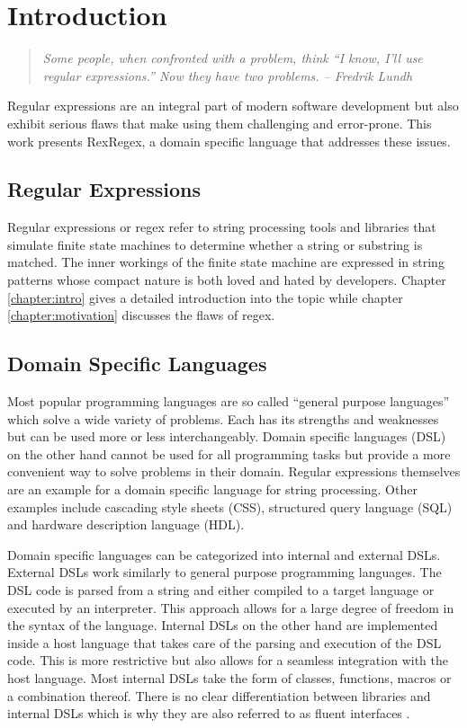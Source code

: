 \chapter{Introduction} \label{chapter:introtoall}

\begin{quote}
\emph{
Some people, when confronted with a problem, think
\enquote{I know, I'll use regular expressions.} Now they have two problems. -- Fredrik Lundh \cite{NowTwoProblems}
    }
\end{quote}

Regular expressions are an integral part of modern software development but also exhibit serious flaws that make using them challenging and error-prone. This work presents RexRegex, a domain specific language that addresses these issues.

\section{Regular Expressions}

Regular expressions or regex refer to string processing tools and libraries that simulate finite state machines to determine whether a string or substring is matched. The inner workings of the finite state machine are expressed in string patterns whose compact nature is both loved and hated by developers. Chapter \ref{chapter:intro} gives a detailed introduction into the topic while chapter \ref{chapter:motivation} discusses the flaws of regex.

\section{Domain Specific Languages}

Most popular programming languages are so called \enquote{general purpose languages} which solve a wide variety of problems. Each has its strengths and weaknesses but can be used more or less interchangeably. Domain specific languages (DSL) on the other hand cannot be used for all programming tasks but provide a more convenient way to solve problems in their domain. Regular expressions themselves are an example for a domain specific language for string processing. Other examples include cascading style sheets (CSS), structured query language (SQL) and hardware description language (HDL).

Domain specific languages can be categorized into internal and external DSLs. External DSLs work similarly to general purpose programming languages. The DSL code is parsed from a string and either compiled to a target language or executed by an interpreter. This approach allows for a large degree of freedom in the syntax of the language. Internal DSLs on the other hand are implemented inside a host language that takes care of the parsing and execution of the DSL code. This is more restrictive but also allows for a seamless integration with the host language. Most internal DSLs take the form of classes, functions, macros or a combination thereof. There is no clear differentiation between libraries and internal DSLs which is why they are also referred to as fluent interfaces \cite{FluentInterfacesFowler}.

